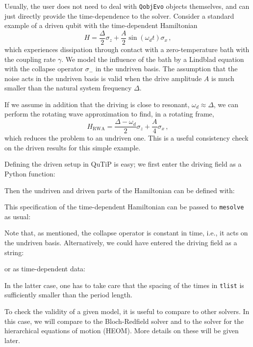 \documentclass[preprint,3p,sort&compress]{elsarticle}
\def\code#1{\texttt{#1}}
\begin{document}
Usually, the user does not need to deal with \code{QobjEvo} objects themselves, and can just directly provide the time-dependence to the solver. Consider a standard example of a driven qubit with the time-dependent Hamiltonian
\begin{equation}
H = \frac{\Delta}{2} \sigma_z + \frac{A}{2} \sin (\omega_d t) \sigma_x \, ,
\end{equation}
which experiences dissipation through contact with a zero-temperature bath with the coupling rate $\gamma$. We model the influence of the bath by a Lindblad equation with the collapse operator $\sigma_-$ in the undriven basis. The assumption that the noise acts in the undriven basis is valid when the drive amplitude $A$ is much smaller than the natural system frequency $\Delta$.

If we assume in addition that the driving is close to resonant, $\omega_d \approx \Delta$, we can perform the rotating wave approximation to find, in a rotating frame,
\begin{equation} \label{eq:mesolve:H_RWA}
H_{\mathrm{RWA}} = \frac{\Delta-\omega_d}{2} \sigma_z + \frac{A}{4} \sigma_x \, ,
\end{equation}
which reduces the problem to an undriven one.  This is a useful consistency check on the driven results for this simple example.

Defining the driven setup in QuTiP is easy; we first enter the driving field as a Python function:

%
Then the undriven and driven parts of the Hamiltonian can be defined with:

%
This specification of the time-dependent Hamiltonian can be passed to \code{mesolve} as usual:

%
Note that, as mentioned, the collapse operator is constant in time, i.e., it acts on the undriven basis.
Alternatively, we could have entered the driving field as a string:

%
or as time-dependent data:

%
In the latter case, one has to take care that the spacing of the times in \code{tlist} is sufficiently smaller than the period length.

To check the validity of a given model, it is useful to compare to other solvers. In this case, we will compare to the Bloch-Redfield solver and to the solver for the hierarchical equations of motion (HEOM).  More details on these will be given later.
\end{document}
